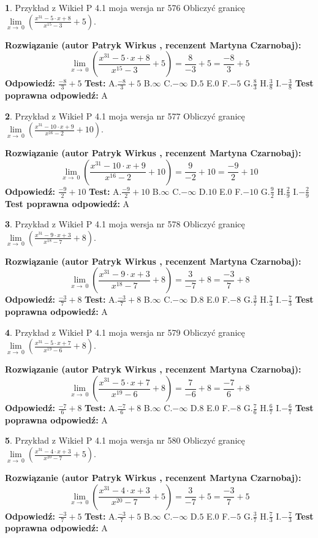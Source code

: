 \documentclass[12pt, a4paper]{article}
\theoremstyle{definition} %
\newtheorem{zad}{}
\newcommand{\zadStart}[1]{\begin{zad}#1\newline}
\newcommand{\zadStop}{\end{zad}}
\newcommand{\rozwStart}[2]{\noindent \textbf{Rozwiązanie (autor #1 , recenzent #2): }\newline}
\newcommand{\rozwStop}{\newline}
\newcommand{\odpStart}{\noindent \textbf{Odpowiedź:}\newline}
\newcommand{\odpStop}{\newline}
\newcommand{\testStart}{\noindent \textbf{Test:}\newline}
\newcommand{\testStop}{\newline}
\newcommand{\kluczStart}{\noindent \textbf{Test poprawna odpowiedź:}\newline}
\newcommand{\kluczStop}{\newline}
\begin{document}
\zadStart{Przykład z Wikieł P 4.1 moja wersja nr 576}
Obliczyć granicę $\lim\limits_{x\to\ 0}(\frac{x^{31}-5 \cdot x +8}{x^{15}-3}+5)$.
\zadStop
\rozwStart{Patryk Wirkus}{Martyna Czarnobaj}
$$\lim\limits_{x\to\ 0}(\frac{x^{31}-5 \cdot x +8}{x^{15}-3}+5)=\frac{8}{-3}+5=\frac{-8}{3}+5$$
\rozwStop
\odpStart
$\frac{-8}{3}+5$
\odpStop
\testStart
A.$\frac{-8}{3}+5$
B.$\infty$
C.$-\infty$
D.$5$
E.$0$
F.$-5$
G.$\frac{8}{3}$
H.$\frac{3}{8}$
I.$-\frac{3}{8}$
\testStop
\kluczStart
A
\kluczStop



\zadStart{Przykład z Wikieł P 4.1 moja wersja nr 577}
Obliczyć granicę $\lim\limits_{x\to\ 0}(\frac{x^{31}-10 \cdot x +9}{x^{16}-2}+10)$.
\zadStop
\rozwStart{Patryk Wirkus}{Martyna Czarnobaj}
$$\lim\limits_{x\to\ 0}(\frac{x^{31}-10 \cdot x +9}{x^{16}-2}+10)=\frac{9}{-2}+10=\frac{-9}{2}+10$$
\rozwStop
\odpStart
$\frac{-9}{2}+10$
\odpStop
\testStart
A.$\frac{-9}{2}+10$
B.$\infty$
C.$-\infty$
D.$10$
E.$0$
F.$-10$
G.$\frac{9}{2}$
H.$\frac{2}{9}$
I.$-\frac{2}{9}$
\testStop
\kluczStart
A
\kluczStop



\zadStart{Przykład z Wikieł P 4.1 moja wersja nr 578}
Obliczyć granicę $\lim\limits_{x\to\ 0}(\frac{x^{31}-9 \cdot x +3}{x^{18}-7}+8)$.
\zadStop
\rozwStart{Patryk Wirkus}{Martyna Czarnobaj}
$$\lim\limits_{x\to\ 0}(\frac{x^{31}-9 \cdot x +3}{x^{18}-7}+8)=\frac{3}{-7}+8=\frac{-3}{7}+8$$
\rozwStop
\odpStart
$\frac{-3}{7}+8$
\odpStop
\testStart
A.$\frac{-3}{7}+8$
B.$\infty$
C.$-\infty$
D.$8$
E.$0$
F.$-8$
G.$\frac{3}{7}$
H.$\frac{7}{3}$
I.$-\frac{7}{3}$
\testStop
\kluczStart
A
\kluczStop



\zadStart{Przykład z Wikieł P 4.1 moja wersja nr 579}
Obliczyć granicę $\lim\limits_{x\to\ 0}(\frac{x^{31}-5 \cdot x +7}{x^{19}-6}+8)$.
\zadStop
\rozwStart{Patryk Wirkus}{Martyna Czarnobaj}
$$\lim\limits_{x\to\ 0}(\frac{x^{31}-5 \cdot x +7}{x^{19}-6}+8)=\frac{7}{-6}+8=\frac{-7}{6}+8$$
\rozwStop
\odpStart
$\frac{-7}{6}+8$
\odpStop
\testStart
A.$\frac{-7}{6}+8$
B.$\infty$
C.$-\infty$
D.$8$
E.$0$
F.$-8$
G.$\frac{7}{6}$
H.$\frac{6}{7}$
I.$-\frac{6}{7}$
\testStop
\kluczStart
A
\kluczStop



\zadStart{Przykład z Wikieł P 4.1 moja wersja nr 580}
Obliczyć granicę $\lim\limits_{x\to\ 0}(\frac{x^{31}-4 \cdot x +3}{x^{20}-7}+5)$.
\zadStop
\rozwStart{Patryk Wirkus}{Martyna Czarnobaj}
$$\lim\limits_{x\to\ 0}(\frac{x^{31}-4 \cdot x +3}{x^{20}-7}+5)=\frac{3}{-7}+5=\frac{-3}{7}+5$$
\rozwStop
\odpStart
$\frac{-3}{7}+5$
\odpStop
\testStart
A.$\frac{-3}{7}+5$
B.$\infty$
C.$-\infty$
D.$5$
E.$0$
F.$-5$
G.$\frac{3}{7}$
H.$\frac{7}{3}$
I.$-\frac{7}{3}$
\testStop
\kluczStart
A
\kluczStop
\end{document}
